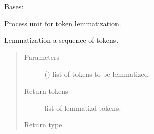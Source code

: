 \documentclass[letterpaper,10pt,english]{sphinxmanual}
\begin{document}
\begin{fulllineitems}
\label{\detokenize{matchzoo:matchzoo.preprocessors.LemmatizationUnit}}
Bases: {\hyperref[\detokenize{matchzoo:matchzoo.preprocessors.ProcessorUnit}]{}}

Process unit for token lemmatization.

\begin{fulllineitems}
\label{\detokenize{matchzoo:matchzoo.preprocessors.LemmatizationUnit.transform}}
Lemmatization a sequence of tokens.
\begin{quote}\begin{description}
\item[{Parameters}] \leavevmode
{} () \textendash{} list of tokens to be lemmatized.

\item[{Return tokens}] \leavevmode
list of lemmatizd tokens.

\item[{Return type}] \leavevmode
{}

\end{description}\end{quote}

\end{fulllineitems}


\end{fulllineitems}

\end{document}
